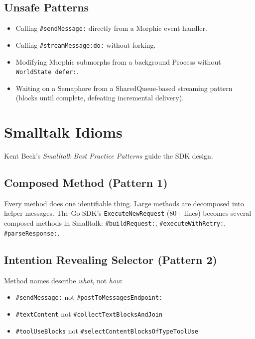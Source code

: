 \documentclass[a4paper,10pt,fleqn]{article}
\newcommand{\sel}[1]{\texttt{\##1}}
\begin{document}
\subsection{Unsafe Patterns}

\begin{itemize}
  \item Calling \sel{sendMessage:} directly from a Morphic event handler.
  \item Calling \sel{streamMessage:do:} without forking.
  \item Modifying Morphic submorphs from a background Process without
    \texttt{WorldState defer:}.
  \item Waiting on a Semaphore from a SharedQueue-based streaming pattern
    (blocks until complete, defeating incremental delivery).
\end{itemize}

\section{Smalltalk Idioms}

Kent Beck's \emph{Smalltalk Best Practice Patterns} guide the SDK design.

\subsection{Composed Method (Pattern 1)}

Every method does one identifiable thing.  Large methods are decomposed
into helper messages.  The Go SDK's \texttt{ExecuteNewRequest} (80+
lines) becomes several composed methods in Smalltalk:
\sel{buildRequest:}, \sel{executeWithRetry:}, \sel{parseResponse:}.

\subsection{Intention Revealing Selector (Pattern 2)}

Method names describe \emph{what}, not \emph{how}:

\begin{itemize}
  \item \sel{sendMessage:} not \sel{postToMessagesEndpoint:}
  \item \sel{textContent} not \sel{collectTextBlocksAndJoin}
  \item \sel{toolUseBlocks} not \sel{selectContentBlocksOfTypeToolUse}
\end{itemize}
\end{document}
